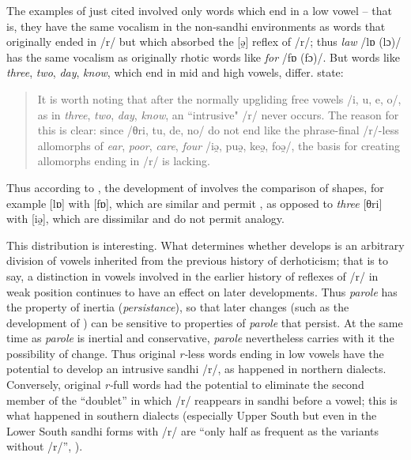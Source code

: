 \documentclass[output=paper,
modfonts
]{LSP/langsci}
\begin{document}
The examples of  just cited involved only words which end
in a low vowel -- that is, they have the same vocalism in the non-sandhi
environments as words that originally ended in /r/ but which absorbed
the {[}ə̯{]} reflex of /r/; thus \emph{law} /lɒ (lɔ)/ has the same
vocalism as originally rhotic words like \emph{for} /fɒ (fɔ)/. But words
like \emph{three}, \emph{two}, \emph{day}, \emph{know}, which end in mid
and high vowels, differ. \citet[172b]{KUR} state:

\begin{quote}
It is worth noting that after the normally upgliding free vowels /i, u,
e, o/, as in \emph{three}, \emph{two}, \emph{day}, \emph{know}, an
 ``intrusive" /r/ never occurs. The reason for this is clear:
since /θri, tu, de, no/ do not end like the phrase-final /r/-less
allomorphs of \emph{ear}, \emph{poor}, \emph{care}, \emph{four} /iə̯,
puə̯, keə̯, foə̯/, the basis for creating allomorphs ending in /r/ is
lacking.
\end{quote}

Thus according to \citet{KUR}, the development of 
involves the comparison of  shapes, for example {[}lɒ{]} with
{[}fɒ{]}, which are similar and permit , as opposed to
\emph{three} {[}θri{]} with {[}iə̯{]}, which are dissimilar and do not
permit analogy.

\newpage 
This distribution is interesting. What determines whether 
 develops is an arbitrary division of vowels inherited from
the previous history of derhoticism; that is to say, a distinction in
vowels involved in the earlier history of reflexes of /r/ in weak
position continues to have an effect on later developments. Thus
\emph{parole} has the property of inertia (\emph{persistance}), so that
later changes (such as the  development of ) can
be sensitive to properties of \emph{parole} that persist. At the same
time as \emph{parole} is inertial and conservative, \emph{parole}
nevertheless carries with it the possibility of change. Thus original
\emph{r-}less words ending in low vowels have the potential to develop
an intrusive sandhi /r/, as happened in northern dialects. Conversely,
original \emph{r-}full words had the potential to eliminate the second
member of the ``doublet'' in which /r/ reappears in sandhi before a
vowel; this is what happened in southern dialects (especially Upper
South but even in the Lower South sandhi forms with /r/ are ``only half
as frequent as the variants without /r/'', \citealt[171b]{KUR}).
\end{document}
